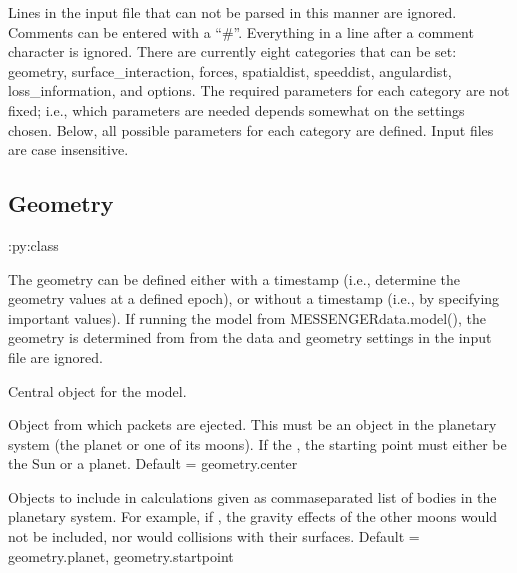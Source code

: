 \documentclass[letterpaper,10pt,english]{sphinxmanual}
\begin{document}
\sphinxAtStartPar
Lines in the input file that can not be parsed in this manner are ignored.
Comments can be entered with a “\#”. Everything in a line
after a comment character is ignored. There are currently eight categories
that can be set: geometry, surface\_interaction,
forces, spatialdist, speeddist, angulardist, loss\_information, and options. The required
parameters for each category are not fixed; i.e., which parameters are needed
depends somewhat on the settings chosen. Below, all possible parameters for
each category are defined. Input files are case insensitive.


\subsection{Geometry}
\label{\detokenize{nexoclom2/inputfiles:geometry}}\label{\detokenize{nexoclom2/inputfiles:id1}}
\sphinxAtStartPar
:py:class 

\sphinxAtStartPar
The geometry can be defined either with a timestamp (i.e., determine the
geometry values at a defined epoch), or without a timestamp (i.e., by
specifying important values). If running the model from MESSENGERdata.model(),
the geometry is determined from from the data and geometry settings in the
input file are ignored.
\begin{description}
\sphinxAtStartPar
Central object for the model.

\sphinxAtStartPar
Object from which packets are ejected. This must be an object in the
planetary system (the planet or one of its moons). If the
, the starting point must either be the Sun or
a planet. Default = geometry.center

\sphinxAtStartPar
Objects to include in calculations given as comma\sphinxhyphen{}separated list of
bodies in the planetary system. For example, if
, the gravity effects of the other moons
would not be included, nor would collisions with their surfaces.
Default = geometry.planet, geometry.startpoint

\end{description}
\end{document}
